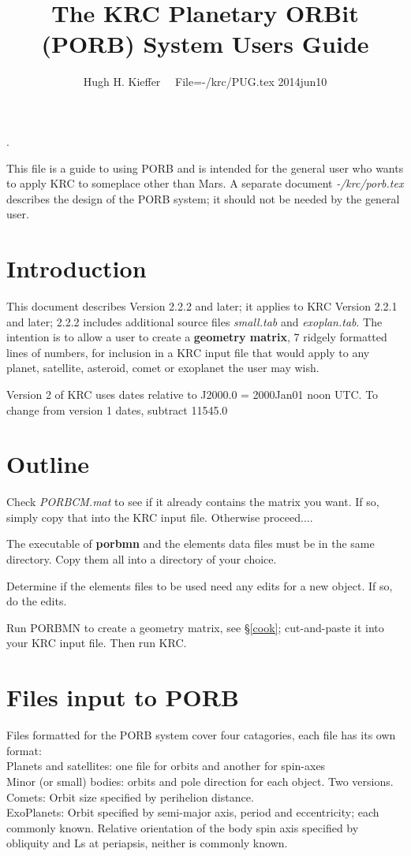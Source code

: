 \documentclass{article}
\title{The KRC Planetary ORBit (PORB) System Users Guide}
\author{Hugh H. Kieffer  \ \ File=-/krc/PUG.tex 2014jun10}
\newcommand{\np}{\textbf}  %
\newcommand{\nf}{\textit}  %
\newcommand{\qi}{\\ \hspace*{2.em}}      %
\begin{document}
\maketitle
\tableofcontents
\hrulefill .\hrulefill

This file is a guide to using PORB and is intended for the general user who
wants to apply KRC to someplace other than Mars.  A separate document
\nf{-/krc/porb.tex} describes the design of the PORB system; it should not be
needed by the general user.

\section{Introduction} 
This document describes Version 2.2.2 and later; it applies to KRC Version 2.2.1
and later; 2.2.2 includes additional source files \nf{small.tab} and
\nf{exoplan.tab}. The intention is to allow a user to create a \textbf{geometry
  matrix}, 7 ridgely formatted lines of numbers, for inclusion in a KRC input
file that would apply to any planet, satellite, asteroid, comet or exoplanet the
user may wish.

Version 2 of KRC uses dates relative to J2000.0 = 2000Jan01 noon UTC. To change
from version 1 dates, subtract 11545.0

\section{Outline}

Check \nf{PORBCM.mat} to see if it already contains the matrix you want. If so, simply copy that into the KRC input file. Otherwise proceed....

The executable of \np{porbmn} and the elements data files must be in the same directory. Copy them all into a directory of your choice.

Determine if the elements files to be used need any edits for a new object.
 If so, do the edits.

Run PORBMN to create a geometry matrix, see \S \ref{cook}; cut-and-paste it into your KRC input
file. Then run KRC.

\section{Files input to PORB} %
Files formatted for the PORB system cover four catagories, each file has its own format:
\qi Planets and satellites:  one file for orbits and another for spin-axes
\qi Minor (or small) bodies: orbits and pole direction for each object. Two versions.
\qi Comets: Orbit size specified by perihelion distance.  
\qi ExoPlanets: Orbit specified by semi-major axis, period and eccentricity; each commonly known. Relative orientation of the body spin axis specified by obliquity and Ls at periapsis, neither is commonly known.
\end{document}
